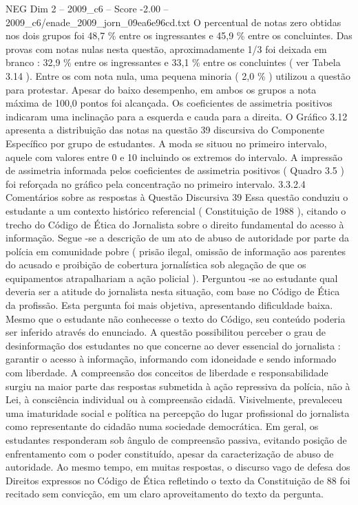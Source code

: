 \begin{textsample}{NEG Dim 2 – 2009\_c6 – Score -2.00 – 2009\_c6/enade\_2009\_jorn\_09ea6e96cd.txt}
O percentual de notas zero obtidas nos dois grupos foi 48,7 \% entre os ingressantes e 45,9 \% entre os concluintes.
Das provas com notas nulas nesta questão, aproximadamente 1/3 foi deixada em branco : 32,9 \% entre os ingressantes e 33,1 \% entre os concluintes ( ver Tabela 3.14 ).
Entre os com nota nula, uma pequena minoria ( 2,0 \% ) utilizou a questão para protestar.
Apesar do baixo desempenho, em ambos os grupos a nota máxima de 100,0 pontos foi alcançada.
Os coeficientes de assimetria positivos indicaram uma inclinação para a esquerda e cauda para a direita.
O Gráfico 3.12 apresenta a distribuição das notas na questão 39 discursiva do Componente Específico por grupo de estudantes.
A moda se situou no primeiro intervalo, aquele com valores entre 0 e 10 incluindo os extremos do intervalo.
A impressão de assimetria informada pelos coeficientes de assimetria positivos ( Quadro 3.5 ) foi reforçada no gráfico pela concentração no primeiro intervalo. 3.3.2.4 Comentários sobre as respostas à Questão Discursiva 39 Essa questão conduziu o estudante a um contexto histórico referencial ( Constituição de 1988 ), citando o trecho do Código de Ética do Jornalista sobre o direito fundamental do acesso à informação.
Segue -se a descrição de um ato de abuso de autoridade por parte da polícia em comunidade pobre ( prisão ilegal, omissão de informação aos parentes do acusado e proibição de cobertura jornalística sob alegação de que os equipamentos atrapalhariam a ação policial ).
Perguntou -se ao estudante qual deveria ser a atitude do jornalista nesta situação, com base no Código de Ética da profissão.
Esta pergunta foi mais objetiva, apresentando dificuldade baixa.
Mesmo que o estudante não conhecesse o texto do Código, seu conteúdo poderia ser inferido através do enunciado.
A questão possibilitou perceber o grau de desinformação dos estudantes no que concerne ao dever essencial do jornalista : garantir o acesso à informação, informando com idoneidade e sendo informado com liberdade.
A compreensão dos conceitos de liberdade e responsabilidade surgiu na maior parte das respostas submetida à ação repressiva da polícia, não à Lei, à consciência individual ou à compreensão cidadã.
Visivelmente, prevaleceu uma imaturidade social e política na percepção do lugar profissional do jornalista como representante do cidadão numa sociedade democrática.
Em geral, os estudantes responderam sob ângulo de compreensão passiva, evitando posição de enfrentamento com o poder constituído, apesar da caracterização de abuso de autoridade.
Ao mesmo tempo, em muitas respostas, o discurso vago de defesa dos Direitos expressos no Código de Ética refletindo o texto da Constituição de 88 foi recitado sem convicção, em um claro aproveitamento do texto da pergunta.

\end{textsample}
